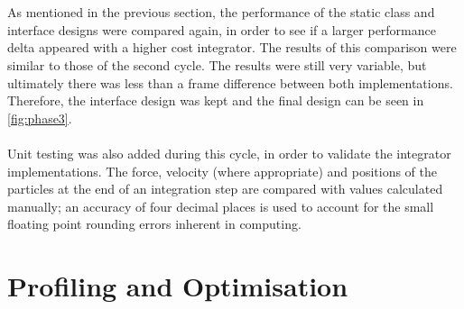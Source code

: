 \\\\As mentioned in the previous section, the performance of the static class and interface designs were compared again, in order to see if a larger performance delta appeared with a higher cost integrator. The results of this comparison were similar to those of the second cycle. The results were still very variable, but ultimately there was less than a frame difference between both implementations. Therefore, the interface design was kept and the final design can be seen in \ref{fig:phase3}.
\\\\Unit testing was also added during this cycle, in order to validate the integrator implementations. The force, velocity (where appropriate) and positions of the particles at the end of an integration step are compared with values calculated manually; an accuracy of four decimal places is used to account for the small floating point rounding errors inherent in computing.

\section{Profiling and Optimisation}
\label{sec:optimisation}

